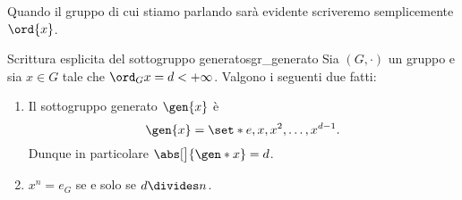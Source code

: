 Quando il gruppo di cui stiamo parlando sarà evidente scriveremo semplicemente $\ord{x}$.

\begin{proposition}
    {Scrittura esplicita del sottogruppo generato}{sgr_generato}
    Sia $(G, \cdot)$ un gruppo e sia $x \in G$ tale che $\ord_{G}{x} = d < +\infty$. 
    Valgono i seguenti due fatti:
    \begin{enumerate}[label={(\roman*)}]
        \item \label{prop:sgr_generato:expr} Il sottogruppo generato $\gen{x}$ è \[
            \gen{x} = \set*{e, x, x^2, \dots, x^{d-1}}.    
        \] Dunque in particolare $\abs[\big]{\gen* x} = d$.
        \item \label{prop:sgr_generato:ord_div_n} $x^n = e_G$ se e solo se $d \divides n$.
    \end{enumerate}
\end{proposition}
